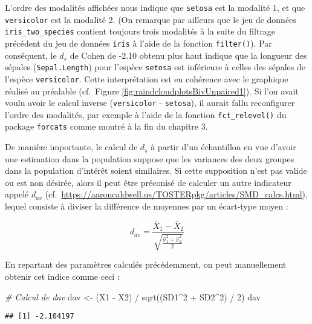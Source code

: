 \documentclass[
]{book}
\newenvironment{Shaded}{\begin{snugshade}}{\end{snugshade}}
\newcommand{\CommentTok}[1]{\textcolor[rgb]{0.56,0.35,0.01}{\textit{#1}}}
\newcommand{\DecValTok}[1]{\textcolor[rgb]{0.00,0.00,0.81}{#1}}
\newcommand{\FunctionTok}[1]{\textcolor[rgb]{0.00,0.00,0.00}{#1}}
\newcommand{\NormalTok}[1]{#1}
\newcommand{\OtherTok}[1]{\textcolor[rgb]{0.56,0.35,0.01}{#1}}
\newcommand{\SpecialCharTok}[1]{\textcolor[rgb]{0.00,0.00,0.00}{#1}}
\begin{document}
L'ordre des modalités affichées nous indique que \texttt{setosa} est la modalité 1, et que \texttt{versicolor} est la modalité 2. (On remarque par ailleurs que le jeu de données \texttt{iris\_two\_species} contient toujours trois modalités à la suite du filtrage précédent du jeu de données \texttt{iris} à l'aide de la fonction \texttt{filter()}). Par conséquent, le \(d_{s}\) de Cohen de -2.10 obtenu plus haut indique que la longueur des sépales (\texttt{Sepal.Length}) pour l'espèce \texttt{setosa} est inférieure à celles des sépales de l'espèce \texttt{versicolor}. Cette interprétation est en cohérence avec le graphique réalisé au préalable (cf.~Figure \ref{fig:raindcloudplotsBivUnpaired1}). Si l'on avait voulu avoir le calcul inverse (\texttt{versicolor} - \texttt{setosa}), il aurait fallu reconfigurer l'ordre des modalités, par exemple à l'aide de la fonction \texttt{fct\_relevel()} du package \texttt{forcats} comme montré à la fin du chapitre 3.

De manière importante, le calcul de \(d_s\) à partir d'un échantillon en vue d'avoir une estimation dans la population suppose que les variances des deux groupes dans la population d'intérêt soient similaires. Si cette supposition n'est pas valide ou est non désirée, alors il peut être préconisé de calculer un autre indicateur appelé \(d_{av}\) (cf.~\url{https://aaroncaldwell.us/TOSTERpkg/articles/SMD_calcs.html}), lequel consiste à diviser la différence de moyennes par un écart-type moyen :

\[d_{av} = \frac{\overline{X}_{1} - \overline{X}_{2}} {\sqrt{\frac{\hat{\sigma}_{1}^2 + \hat{\sigma}_{2}^2} {2}}}\]

En repartant des paramètres calculés précédemment, on peut manuellement obtenir cet indice comme ceci :

\begin{Shaded}
\begin{Highlighting}[]
\CommentTok{\# Calcul de dav}
\NormalTok{dav }\OtherTok{\textless{}{-}}\NormalTok{ (X1 }\SpecialCharTok{{-}}\NormalTok{ X2) }\SpecialCharTok{/} \FunctionTok{sqrt}\NormalTok{((SD1}\SpecialCharTok{\^{}}\DecValTok{2} \SpecialCharTok{+}\NormalTok{ SD2}\SpecialCharTok{\^{}}\DecValTok{2}\NormalTok{) }\SpecialCharTok{/} \DecValTok{2}\NormalTok{)}
\NormalTok{dav}
\end{Highlighting}
\end{Shaded}

\begin{verbatim}
## [1] -2.104197
\end{verbatim}
\end{document}
